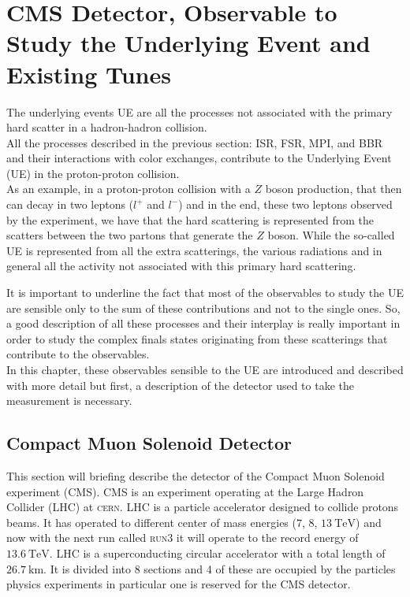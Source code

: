 
\chapter{CMS Detector, Observable to Study the Underlying Event and Existing Tunes}
\label{chap:ObservabletoStudytheUnderlyingEvent}

The underlying events UE are all the processes not associated with the primary hard scatter in a hadron-hadron collision.
\\
All the processes described in the previous section: ISR, FSR, MPI, and BBR and their interactions with color exchanges, contribute to the Underlying Event (UE) in the proton-proton collision.
\\
As an example, in a proton-proton collision with a $Z$ boson production, that then can decay in two leptons ($l^+$ and $l^-$) and in the end, these two leptons observed by the experiment, we have that the hard scattering is represented from the scatters between the two partons that generate the $Z$ boson. While the so-called UE is represented from all the extra scatterings, the various radiations and in general all the activity not associated with this primary hard scattering.  

\medskip

It is important to underline the fact that most of the observables to study the UE are sensible only to the sum of these contributions and not to the single ones. So, a good description of all these processes and their interplay is really important in order to study the complex finals states originating from these scatterings that contribute to the observables.
\\
In this chapter, these observables sensible to the UE are introduced and described with more detail but first, a description of the detector used to take the measurement is necessary.


\section{Compact Muon Solenoid Detector}

This section will briefing describe the detector of the Compact Muon Solenoid experiment (CMS). CMS is an experiment operating at the Large Hadron Collider (LHC) at \textsc{cern}. LHC is a particle accelerator designed to collide protons beams. It has operated to different center of mass energies ($7$, $8$, $13\ \mathrm{TeV}$) and now with the next run called \textsc{run3} it will operate to the record energy of $13.6\ \mathrm{TeV}$. LHC is a superconducting circular accelerator with a total length of $26.7\ \mathrm{km}$. It is divided into 8 sections and 4 of these are occupied by the particles physics experiments in particular one is reserved for the CMS detector.

